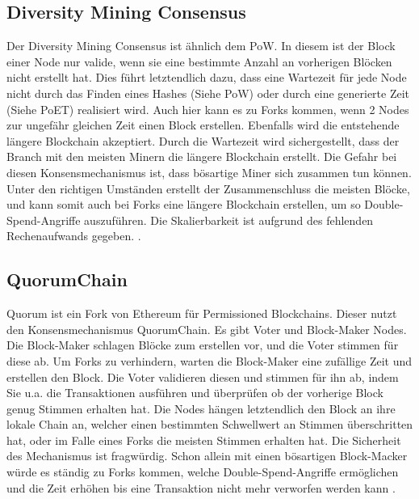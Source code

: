 \subsection{Diversity Mining Consensus}
Der Diversity Mining Consensus ist ähnlich dem PoW. In diesem ist der Block einer Node nur valide, wenn sie eine bestimmte Anzahl an vorherigen Blöcken nicht erstellt hat. Dies führt letztendlich dazu, dass eine Wartezeit für jede Node nicht durch das Finden eines Hashes (Siehe PoW) oder durch eine generierte Zeit (Siehe PoET) realisiert wird. Auch hier kann es zu Forks kommen, wenn 2 Nodes zur ungefähr gleichen Zeit einen Block erstellen. Ebenfalls wird die entstehende längere Blockchain akzeptiert. Durch die Wartezeit wird sichergestellt, dass der Branch mit den meisten Minern die längere Blockchain erstellt. Die Gefahr bei diesen Konsensmechanismus ist, dass bösartige Miner sich zusammen tun können. Unter den richtigen Umständen erstellt der Zusammenschluss die meisten Blöcke, und kann somit auch bei Forks eine längere Blockchain erstellen, um so Double-Spend-Angriffe auszuführen. Die Skalierbarkeit ist aufgrund des fehlenden Rechenaufwands gegeben. \cite{GreenspanMultiChainPrivateBlockchain2015}\cite{CachinBlockchainConsensusProtocols2017}.

\subsection{QuorumChain}
Quorum ist ein Fork von Ethereum für Permissioned Blockchains. Dieser nutzt den Konsensmechanismus QuorumChain. Es gibt Voter und Block-Maker Nodes. Die Block-Maker schlagen Blöcke zum erstellen vor, und die Voter stimmen für diese ab. Um Forks zu verhindern, warten die Block-Maker eine zufällige Zeit und erstellen den Block. Die Voter validieren diesen und stimmen für ihn ab, indem Sie u.a. die Transaktionen ausführen und überprüfen ob der vorherige Block genug Stimmen erhalten hat. Die Nodes hängen letztendlich den Block an ihre lokale Chain an, welcher einen bestimmten Schwellwert an Stimmen überschritten hat, oder im Falle eines Forks die meisten Stimmen erhalten hat. Die Sicherheit des Mechanismus ist fragwürdig. Schon allein mit einen bösartigen Block-Macker würde es ständig zu Forks kommen, welche Double-Spend-Angriffe ermöglichen und die Zeit erhöhen bis eine Transaktion nicht mehr verworfen werden kann \cite{CachinBlockchainConsensusProtocols2017}.


